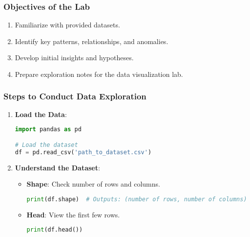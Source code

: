 \documentclass[aspectratio=169]{beamer}
\begin{document}
\begin{frame}
    \frametitle{Objectives of the Lab}
    \begin{enumerate}
        \item Familiarize with provided datasets.
        \item Identify key patterns, relationships, and anomalies.
        \item Develop initial insights and hypotheses.
        \item Prepare exploration notes for the data visualization lab.
    \end{enumerate}
\end{frame}

\begin{frame}[fragile]
    \frametitle{Steps to Conduct Data Exploration}
    \begin{enumerate}
        \item \textbf{Load the Data}:
        \begin{lstlisting}[language=Python]
import pandas as pd

# Load the dataset
df = pd.read_csv('path_to_dataset.csv')
        \end{lstlisting}
        
        \item \textbf{Understand the Dataset}:
        \begin{itemize}
            \item \textbf{Shape}: Check number of rows and columns.
            \begin{lstlisting}[language=Python]
print(df.shape)  # Outputs: (number of rows, number of columns)
            \end{lstlisting}
            \item \textbf{Head}: View the first few rows.
            \begin{lstlisting}[language=Python]
print(df.head())
            \end{lstlisting}
        \end{itemize}
    \end{enumerate}
\end{frame}
\end{document}
